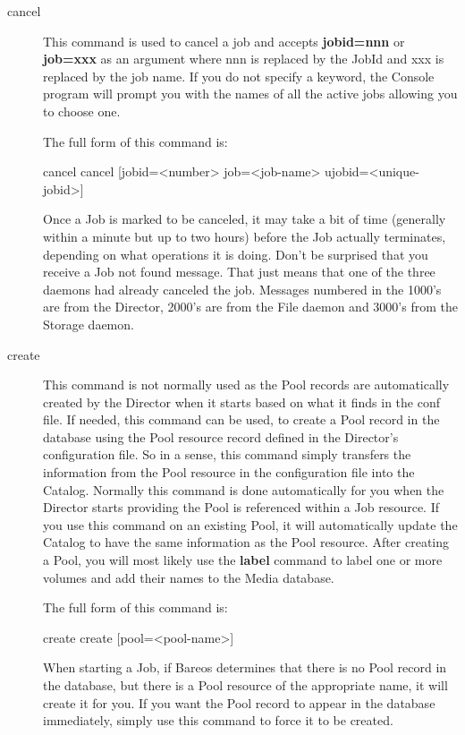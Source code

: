 \begin{description}
\item [cancel]
   This command is used to cancel a job and accepts {\bf jobid=nnn} or {\bf
   job=xxx} as an argument where nnn is replaced by the JobId and xxx is
   replaced by the job name.  If you do not specify a keyword, the Console
   program will prompt you with the names of all the active jobs allowing
   you to choose one.

   The full form of this command is:

\begin{bconsole}{cancel}
cancel [jobid=<number> job=<job-name> ujobid=<unique-jobid>]
\end{bconsole}

   Once a Job is marked to be canceled, it may take a bit of time
   (generally within a minute but up to two hours) before the Job actually
   terminates, depending on what operations it is doing.
   Don't be surprised that you receive a Job not found message. That just
   means that one of the three daemons had already canceled the job.
   Messages numbered in the 1000's are from the Director, 2000's are from
   the File daemon and 3000's from the Storage daemon.

\item [create]
   This command is not normally used as the Pool records are automatically
   created by the Director when it starts based on what it finds in
   the conf file.  If needed, this command can be used,
   to create a Pool record in the database using the
   Pool resource record defined in the Director's configuration file.  So
   in a sense, this command simply transfers the information from the Pool
   resource in the configuration file into the Catalog.  Normally this
   command is done automatically for you when the Director starts providing
   the Pool is referenced within a Job resource.  If you use this command
   on an existing Pool, it will automatically update the Catalog to have
   the same information as the Pool resource.  After creating a Pool, you
   will most likely use the {\bf label} command to label one or more
   volumes and add their names to the Media database.

   The full form of this command is:

\begin{bconsole}{create}
create [pool=<pool-name>]
\end{bconsole}


   When starting a Job, if Bareos determines that there is no Pool record
   in the database, but there is a Pool resource of the appropriate name,
   it will create it for you.  If you want the Pool record to appear in the
   database immediately, simply use this command to force it to be created.


\end{description}
